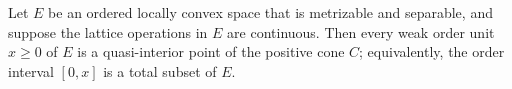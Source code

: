 Let $E$ be an ordered locally convex space that is metrizable and separable, and suppose the lattice operations in $E$ are continuous. Then every weak order unit $x \geq 0$ of $E$ is a quasi-interior point of the positive cone $C$; equivalently, the order interval $[0, x]$ is a total subset of $E$.
